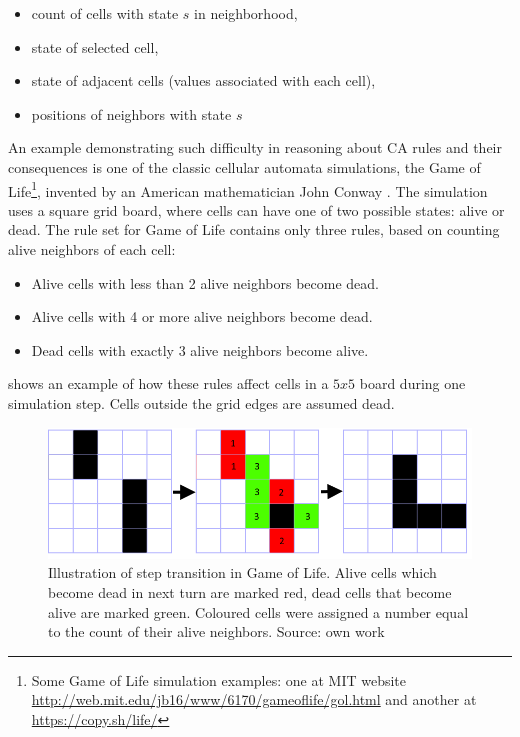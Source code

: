 \documentclass[12pt]{report}
\begin{document}
\begin{itemize}
	\item count of cells with state $s$ in neighborhood,
	\item state of selected cell,
	\item state of adjacent cells (values associated with each cell),
	\item positions of neighbors with state $s$ 
\end{itemize}

An example demonstrating such difficulty in reasoning about CA rules and their consequences is one of the classic cellular automata simulations, the Game of Life\footnote{Some Game of Life simulation examples: one at MIT website \url{http://web.mit.edu/jb16/www/6170/gameoflife/gol.html} and another at \url{https://copy.sh/life/}}, invented by an American mathematician John Conway \autocite{conway1970game}. The simulation uses a square grid board, where cells can have one of two possible states: alive or dead. The rule set for Game of Life contains only three rules, based on counting alive neighbors of each cell: 

\begin{itemize}
	\item Alive cells with less than 2 alive neighbors become dead.
	\item Alive cells with 4 or more alive neighbors become dead.
	\item Dead cells with exactly 3 alive neighbors become alive.
\end{itemize}

 shows an example of how these rules affect cells in a $5x5$ board during one simulation step. Cells outside the grid edges are assumed dead. 

\begin{figure}[H]
	\centering
	\includegraphics[width=0.7\linewidth]{images/applygol} 
	\caption{Illustration of step transition in Game of Life. Alive cells which become dead in next turn are marked red, dead cells that become alive are marked green. Coloured cells were assigned a number equal to the count of their alive neighbors. Source: own work}
	\label{fig:applygol}
\end{figure}
\end{document}
